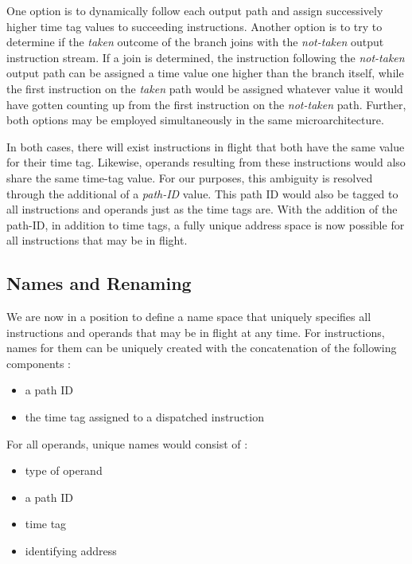 \documentclass[10pt,dvips]{article}
\begin{document}
One option is to dynamically follow
each output path and assign successively higher time tag values
to succeeding instructions.
Another option is to try to determine if the \textit{taken} outcome
of the branch joins with the \textit{not-taken} output instruction
stream.  If a join is determined, the instruction following
the \textit{not-taken} output path can be assigned a time value
one higher than the branch itself, while the first instruction
on the \textit{taken} path would be assigned whatever value
it would have gotten counting up from the first instruction
on the \textit{not-taken} path.
Further, both options may be employed simultaneously in the
same microarchitecture.

In both cases, there will exist instructions in flight
that both have the same value for their time tag.  
Likewise,
operands resulting from these instructions would also share
the same time-tag value.
For our purposes, this ambiguity is resolved through the
additional of a \textit{path-ID} value.
This path ID would also be tagged to all instructions and
operands just as the time tags are.
With the addition of the path-ID, in addition to time tags,
a fully unique address space is now possible for
all instructions that may be in flight.
%
\subsection{Names and Renaming}
%
We are now in a position to define a name space that
uniquely specifies all instructions and operands that
may be in flight at any time.
For instructions, names for them can be uniquely created
with the concatenation of the following components :
%
\begin{itemize}
\vspace{-0.05in}
\item{a path ID}
\vspace{-0.05in}
\item{the time tag assigned to a dispatched instruction}
\vspace{-0.05in}
\end{itemize}   
%
For all operands, unique names would consist of :
%
\begin{itemize}
\vspace{-0.05in}
\item{type of operand}
\vspace{-0.05in}
\item{a path ID}
\vspace{-0.05in}
\item{time tag}
\vspace{-0.05in}
\item{identifying address}
\vspace{-0.05in}
\end{itemize}   
%
\end{document}
